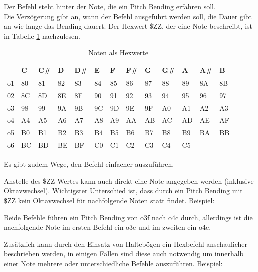 Der Befehl steht hinter der Note, die ein Pitch Bending erfahren soll. \\
Die Verzögerung gibt an, wann der Befehl ausgeführt werden soll, die Dauer gibt an wie lange das Bending dauert. Der Hexwert \$ZZ, der eine Note beschreibt, ist in Tabelle \ref{Noten} nachzulesen.

\begin{table}
\begin{tabularx}{\textwidth}{|l|X|X|X|X|X|X|X|X|X|X|X|X|}
	\hline
	& C & C\# & D & D\# & E & F & F\# & G & G\# & A & A\# & B   \\
	\hline
	o1 & 80 & 81 & 82 & 83 & 84 & 85 & 86 & 87 & 88 & 89 & 8A & 8B \\
	\hline
	02 & 8C & 8D & 8E & 8F & 90 & 91 & 92 & 93 & 94 & 95 & 96 & 97 \\
	\hline
	o3 & 98 & 99 & 9A & 9B & 9C & 9D & 9E & 9F & A0 & A1 & A2 & A3 \\
	\hline
	o4 & A4 & A5 & A6 & A7 & A8 & A9 & AA & AB & AC & AD & AE & AF \\
	\hline
	o5 & B0 & B1 & B2 & B3 & B4 & B5 & B6 & B7 & B8 & B9 & BA & BB \\
	\hline
	o6 & BC & BD & BE & BF & C0 & C1 & C2 & C3 & C4 & C5 & & \\
	\hline
\end{tabularx}
\caption{Noten als Hexwerte}
\label{Noten}
\end{table}


Es gibt zudem Wege, den Befehl einfacher auszuführen.

\bigskip

Anstelle des \$ZZ Wertes kann auch direkt eine Note angegeben werden (inklusive Oktavwechsel). Wichtigster Unterschied ist, dass durch ein Pitch Bending mit \$ZZ kein Oktavwechsel für nachfolgende Noten statt findet. Beispiel:

\medskip



\medskip

Beide Befehle führen ein Pitch Bending von o3f nach o4c durch, allerdings ist die nachfolgende Note im ersten Befehl ein o3e und im zweiten ein o4e.

\bigskip

Zusätzlich kann durch den Einsatz von Haltebögen ein Hexbefehl anschaulicher beschrieben werden, in einigen Fällen sind diese auch notwendig um innerhalb einer Note mehrere oder unterschiedliche Befehle auszuführen. Beispiel:

